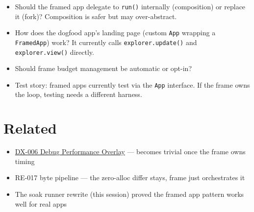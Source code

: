 \begin{itemize}
\tightlist
\item
  Should the framed app delegate to \texttt{r\allowbreak{}u\allowbreak{}n\allowbreak{}(\allowbreak{})} internally (composition) or replace it (fork)? Composition is safer but may over-abstract.
\item
  How does the dogfood app's landing page (custom \texttt{A\allowbreak{}p\allowbreak{}p} wrapping a \texttt{F\allowbreak{}r\allowbreak{}a\allowbreak{}m\allowbreak{}e\allowbreak{}d\allowbreak{}A\allowbreak{}p\allowbreak{}p}) work? It currently calls \texttt{e\allowbreak{}x\allowbreak{}p\allowbreak{}l\allowbreak{}o\allowbreak{}r\allowbreak{}e\allowbreak{}r\allowbreak{}.\allowbreak{}u\allowbreak{}p\allowbreak{}d\allowbreak{}a\allowbreak{}t\allowbreak{}e\allowbreak{}(\allowbreak{})} and \texttt{e\allowbreak{}x\allowbreak{}p\allowbreak{}l\allowbreak{}o\allowbreak{}r\allowbreak{}e\allowbreak{}r\allowbreak{}.\allowbreak{}v\allowbreak{}i\allowbreak{}e\allowbreak{}w\allowbreak{}(\allowbreak{})} directly.
\item
  Should frame budget management be automatic or opt-in?
\item
  Test story: framed apps currently test via the \texttt{A\allowbreak{}p\allowbreak{}p} interface. If the frame owns the loop, testing needs a different harness.
\end{itemize}

\section{Related}\label{record-373-related}

\begin{itemize}
\tightlist
\item
  \href{https://github.com/flyingrobots/bijou/blob/cbd70612140e7a450d764b3c7be1c6af878b99bc/docs/retro/DX_006-debug-performance-overlay-component.md}{DX-006 Debug Performance Overlay} --- becomes trivial once the frame owns timing
\item
  RE-017 byte pipeline --- the zero-alloc differ stays, frame just orchestrates it
\item
  The soak runner rewrite (this session) proved the framed app pattern works well for real apps
\end{itemize}

